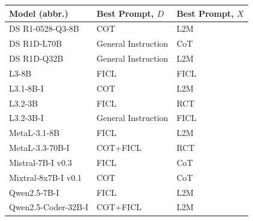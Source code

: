 \documentclass[conference]{IEEEtran}
\begin{document}

\label{app:recruitment_form}


\begin{table}[ht]
\centering
\begin{tabular}{@{}lll@{}}
\toprule
Model (abbr.) & Best Prompt, $D$ & Best Prompt, $X$ \\
\midrule
DS R1-0528-Q3-8B        & COT              & L2M \\
DS R1D-L70B             & General Instruction & CoT \\
DS R1D-Q32B             & General Instruction & L2M \\
L3-8B                   & FICL             & FICL \\
L3.1-8B-I               & COT              & L2M \\
L3.2-3B                 & FICL             & RCT \\
L3.2-3B-I               & General Instruction & FICL \\
MetaL-3.1-8B            & FICL             & L2M \\
MetaL-3.3-70B-I         & COT+FICL         & RCT \\
Mistral-7B-I v0.3       & FICL             & CoT \\
Mixtral-8x7B-I v0.1     & COT              & CoT \\
Qwen2.5-7B-I            & FICL             & L2M \\
Qwen2.5-Coder-32B-I     & COT+FICL         & L2M \\
\bottomrule
\end{tabular}
\end{table}
\end{document}
